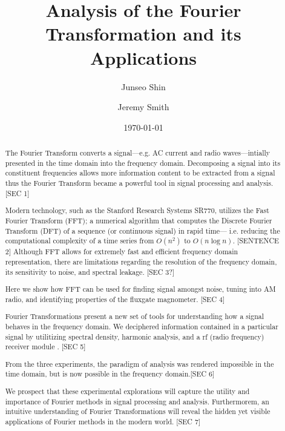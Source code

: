\documentclass[prl,twocolumn,superscriptaddress,floatfix]{revtex4}
\begin{document}
\title{Analysis of the Fourier Transformation and its Applications}
\author{Junseo Shin}
\author{Jeremy Smith}

\date{\today}

\begin{abstract}
The Fourier Transform converts a signal---e.g. AC current and radio waves---intially presented in the time domain into the frequency domain.
Decomposing a signal into its constituent frequencies allows more information content to be extracted from a signal 
thus the Fourier Transform became a powerful tool in signal processing and analysis. [SEC 1]

Modern technology, such as the Stanford Research Systems SR770, utilizes the Fast Fourier Transform (FFT);
a numerical algorithm that computes the Discrete Fourier Transform (DFT) of a sequence (or continuous signal) in rapid time--- i.e. reducing the computational complexity of a time series from $O(n^2)$ to $O(n \log n)$\cite{FFT}. [SENTENCE 2]
Although FFT allows for extremely fast and efficient frequency domain representation, there are limitations regarding the resolution of the frequency domain,
its sensitivity to noise, and spectral leakage. [SEC 3?]

Here we show how FFT can be used for finding signal amongst noise, tuning into AM radio, and identifying properties of the fluxgate magnometer. [SEC 4]

Fourier Transformations present a new set of tools for understanding how a signal behaves in the frequency domain.
We deciphered information contained in a particular signal by utilitizing spectral density, harmonic analysis, and a rf (radio frequency) receiver module . [SEC 5]

From the three experiments, the paradigm of analysis was rendered impossible in the time domain, but is now possible in the frequency domain.[SEC 6]

We prospect that these experimental explorations will capture the utility and importance of Fourier methods in signal processing and analysis.
Furthermorem, an intuitive understanding of Fourier Transformations will reveal the hidden yet visible applications of Fourier methods in the modern world. [SEC 7]
\end{abstract}
\maketitle
\end{document}
